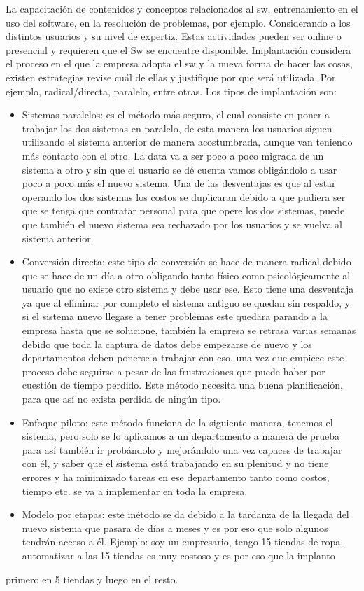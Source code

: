 
La capacitación de contenidos y conceptos relacionados al sw, entrenamiento en el uso del software, en la resolución de problemas, por ejemplo. Considerando a los distintos usuarios y su nivel de expertiz. Estas actividades pueden ser online o presencial y requieren que el Sw se encuentre disponible.
Implantación considera el proceso en el que la empresa adopta el sw y la nueva forma de hacer las cosas, existen estrategias revise cuál de ellas y justifique por que será utilizada. Por ejemplo, radical/directa, paralelo, entre otras. Los tipos de implantación son:
\begin{itemize}
    \item Sistemas paralelos: es el método más seguro, el cual consiste en poner a trabajar los dos sistemas en paralelo, de esta manera los usuarios siguen utilizando el sistema anterior de manera acostumbrada, aunque van teniendo más contacto con el otro. La data va a ser poco a poco migrada de un sistema a otro y sin que el usuario se dé cuenta vamos obligándolo a usar poco a poco más el nuevo sistema. Una de las desventajas es que al estar operando los dos sistemas los costos se duplicaran debido a que pudiera ser que se tenga que contratar personal para que opere los dos sistemas, puede que también el nuevo sistema sea rechazado por los usuarios y se vuelva al sistema anterior.
    \item Conversión directa: este tipo de conversión se hace de manera radical debido que se hace de un día a otro obligando tanto físico como psicológicamente al usuario que no existe otro sistema y debe usar ese. Esto tiene una desventaja ya que al eliminar por completo el sistema antiguo se quedan sin respaldo, y si el sistema nuevo llegase a tener problemas este quedara parando a la empresa hasta que se solucione, también la empresa se retrasa varias semanas debido que toda la captura de datos debe empezarse de nuevo y los departamentos deben ponerse a trabajar con eso. una vez que empiece este proceso debe seguirse a pesar de las frustraciones que puede haber por cuestión de tiempo perdido. Este método necesita una buena planificación, para que así no exista perdida de ningún tipo.
    \item Enfoque piloto:   este método funciona de la siguiente manera, tenemos el sistema, pero solo se lo aplicamos a un departamento a manera de prueba para así también ir probándolo y mejorándolo una vez capaces de trabajar con él, y saber que el sistema está trabajando en su plenitud y no tiene errores y ha minimizado tareas en ese departamento tanto como costos, tiempo etc. se va a implementar en toda la empresa.
    \item Modelo por etapas: este método se da debido a la tardanza de la llegada del nuevo sistema que pasara de días a meses y es por eso que solo algunos tendrán acceso a él. Ejemplo: soy un empresario, tengo 15 tiendas de ropa, automatizar a las 15 tiendas es muy costoso y es por eso que la implanto
\end{itemize} primero en 5 tiendas y luego en el resto.
